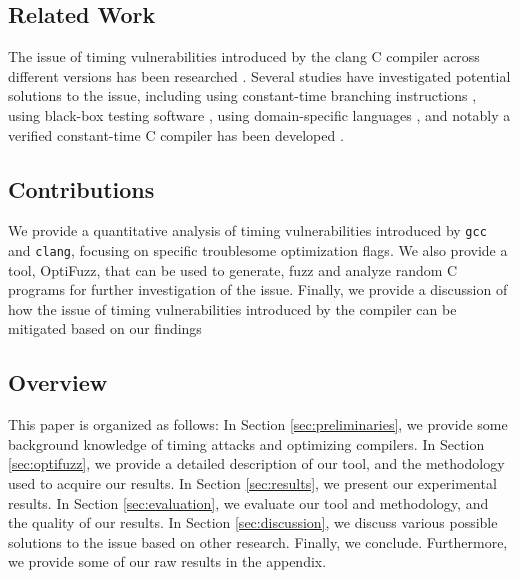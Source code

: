 \subsection{Related Work}
The issue of timing vulnerabilities introduced by the clang C compiler across different versions has been researched \citep{what-you-c}. 
Several studies have investigated potential solutions to the issue, including using constant-time branching instructions \citep{what-you-c}, using black-box testing software \citep{dudect}, using domain-specific languages \citep{fact}, and notably a verified constant-time C compiler has been developed \citep{verified-constant-time-c-comiler}.

\subsection{Contributions}
We provide a quantitative analysis of timing vulnerabilities introduced by \texttt{gcc} and \texttt{clang}, focusing on specific troublesome optimization flags.
We also provide a tool, OptiFuzz, that can be used to generate, fuzz and analyze random C programs for further investigation of the issue.
Finally, we provide a discussion of how the issue of timing vulnerabilities introduced by the compiler can be mitigated based on our findings
\subsection{Overview}
This paper is organized as follows: 
In Section \ref{sec:preliminaries}, we provide some background knowledge of timing attacks and optimizing compilers.
In Section \ref{sec:optifuzz}, we provide a detailed description of our tool, and the methodology used to acquire our results.
In Section \ref{sec:results}, we present our experimental results.
In Section \ref{sec:evaluation}, we evaluate our tool and methodology, and the quality of our results.
In Section \ref{sec:discussion}, we discuss various possible solutions to the issue based on other research.
Finally, we conclude.
Furthermore, we provide some of our raw results in the appendix.